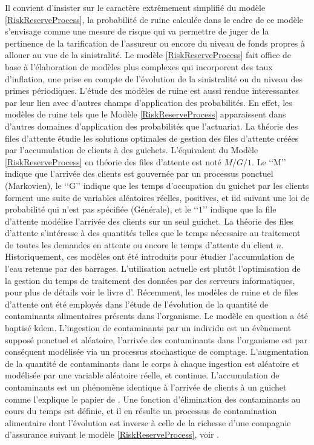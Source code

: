 Il convient d\rq{}insister sur le caractère extrêmement simplifié du modèle \ref{RiskReserveProcess}, la probabilité de ruine calculée dans le cadre de ce modèle s\rq{}envisage comme une mesure de risque qui va permettre de juger de la pertinence de la tarification de l\rq{}assureur ou encore du niveau de fonds propres à allouer au vue de la sinistralité. Le modèle \ref{RiskReserveProcess} fait office de base à l\rq{}élaboration de modèles plus complexes qui incorporent des taux d\rq{}inflation, une prise en compte de l\rq{}évolution de la sinistralité ou du niveau des primes périodiques. L\rq{}étude des modèles de ruine est aussi rendue interessantes par leur lien avec d\rq{}autres champs d\rq{}application des probabilités. En effet, les modèles de ruine tels que le Modèle \ref{RiskReserveProcess} apparaissent dans d\rq{}autres domaines d\rq{}application des probabilités que l\rq{}actuariat. La théorie des files d\rq{}attente étudie les solutions optimales de gestion des files d\rq{}attente créées par l\rq{}accumulation de clients à des guichets. L\rq{}équivalent du Modèle \ref{RiskReserveProcess} en théorie des files d\rq{}attente est noté $M/G/1$.  Le \lq\lq{}M\rq\rq{} indique que l\rq{}arrivée des clients est gouvernée par un processus ponctuel (Markovien), le \lq\lq{}G\rq\rq{} indique que les temps d\rq{}occupation du guichet par les clients forment une suite de variables aléatoires réelles, positives, et \gls{iid} suivant une loi de probabilité qui n\rq{}est pas spécifiée (Générale), et le \lq\lq{}$1$\rq\rq{} indique que la file d\rq{}attente modélise l\rq{}arrivée des clients sur un seul guichet. La théorie des files d\rq{}attente s\rq{}intéresse à des quantités telles que le temps nécessaire au traitement de toutes les demandes en attente ou encore le temps d\rq{}attente du client $n$. Historiquement, ces modèles ont été introduits pour étudier l\rq{}accumulation de l\rq{}eau retenue par des barrages. L\rq{}utilisation actuelle est plutôt l\rq{}optimisation de la gestion du temps de traitement des données par des serveurs informatiques, pour plus de détails voir le livre d\rq{}\citet{As03}. Récemment, les modèles de ruine et de files d\rq{}attente ont été employés dans l\rq{}étude de l\rq{}évolution de la quantité de contaminants alimentaires présents dans l\rq{}organisme. Le modèle en question a été baptisé \gls{kdem}. L\rq{}ingestion de contaminants par un individu est un évènement supposé ponctuel et aléatoire, l\rq{}arrivée des contaminants dans l\rq{}organisme est par conséquent modélisée via un processus stochastique de comptage. L\rq{}augmentation de la quantité de contaminants dans le corps à chaque ingestion est aléatoire et modélisée par une variable aléatoire réelle, et continue. L\rq{}accumulation de contaminants est un phénomène identique à l\rq{}arrivée de clients à un guichet comme l\rq{}explique le papier de \citet{BeClTr08}. Une fonction d\rq{}élimination des contaminants au cours du temps est définie, et il en résulte un processus de contamination alimentaire dont l\rq{}évolution est inverse à celle de la richesse d\rq{}une compagnie d\rq{}assurance suivant le modèle \ref{RiskReserveProcess}, voir \citet{BeLo14}.\\

